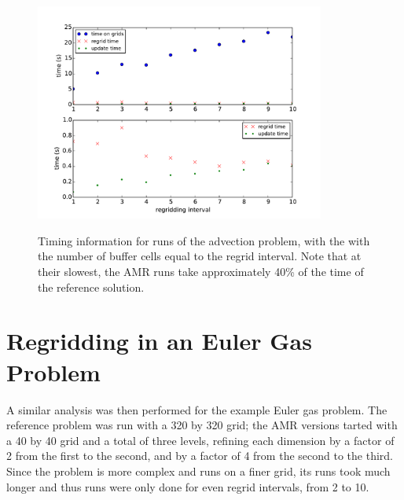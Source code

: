 \documentclass[11pt]{article}
\begin{document}
\begin{figure}[!htb]
\centering
\caption{Timing information for runs of the advection problem, with the
with the number of buffer cells equal to the regrid interval. Note that
at their slowest, the AMR runs take approximately 40\% of the time of the
reference solution.}
\includegraphics[width=0.85\textwidth]{myclaw/time_advec}
\label{fig:time_advec}
\end{figure}


\section*{Regridding in an Euler Gas Problem}
A similar analysis was then performed for the example Euler gas problem.
The reference problem was run with a 320 by 320 grid; the AMR versions
tarted with a 40 by 40 grid and a total of three levels, refining each 
dimension by a factor of 2 from the first to the second, and by a 
factor of 4 from the second to the third.
Since the problem is more complex and runs on a finer grid, its runs took
much longer and thus runs were only done for even regrid intervals, from
2 to 10.
\end{document}

